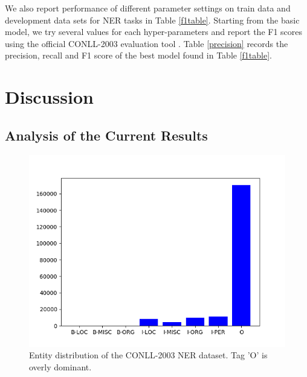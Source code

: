 \documentclass[11pt,a4paper]{article}
\begin{document}

We also report performance of different parameter settings on train data and development data sets for NER tasks in Table \ref{f1table}. Starting from the basic model, we try several values for each hyper-parameters and report the F1 scores using the official CONLL-2003 evaluation tool \cite{tjongkimsang2003conll}. Table \ref{precision} records the precision, recall and F1 score of the best model found in Table \ref{f1table}. 



\section{Discussion} \label{sec:discussion}%

\subsection{Analysis of the Current Results}

\begin{figure}[t]
\centering
   \includegraphics[width=0.8\linewidth]{NER_groundtruths.png}
   \caption{Entity distribution of the CONLL-2003 NER dataset. Tag 'O' is overly dominant.}
\label{fig_ner_gt}
\end{figure}
\end{document}

